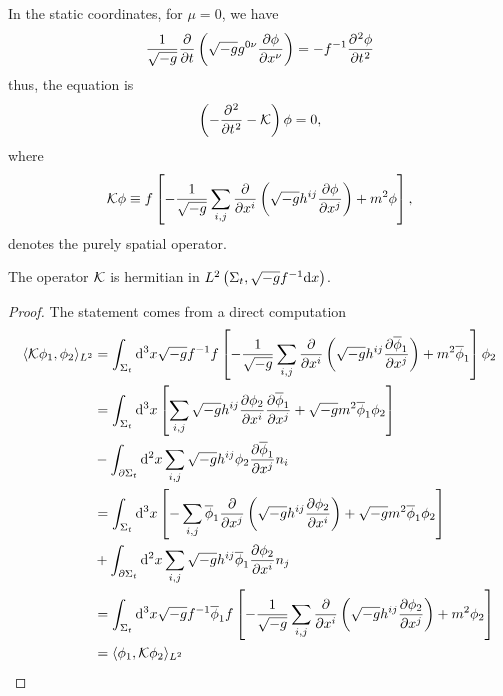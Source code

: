 In the static coordinates, for \(\mu=0\), we have
\begin{equation}
    \frac{1}{\sqrt{-g}}\diffp{}{t}\left(\sqrt{-g}g^{0\nu}\diffp{\phi}{x^\nu}\right)=-f^{-1}\diffp[2]{\phi}{t,}
\end{equation}
thus, the equation is
\begin{equation}
    \left(-\diffp[2]{}{t}-\mcK\right)\phi=0,
\end{equation}
where
\begin{equation}\label{eq:def-mcK}
    \mcK\phi\equiv f\left[-\frac{1}{\sqrt{-g}}\sum_{i,j}\diffp{}{x^i}\left(\sqrt{-g}h^{ij}\diffp{\phi}{x^j}\right)+m^2\phi\right],
\end{equation}
denotes the purely spatial operator.
\begin{proposition}
    The operator \({\mathcal{K}}\) is hermitian in \(L^2\left(\Sigma_t,\sqrt{-g}f^{-1}\mathrm{d} x\right)\).
\end{proposition}
\begin{proof}
    The statement comes from a direct computation
    \begin{subequations}
        \begin{align}
            \langle\mcK\phi_1,\phi_2\rangle_{L^2}&=\int_{\Sig_t}\rmd^3x\sqrt{-g}f^{-1}f\left[-\frac{1}{\sqrt{-g}}\sum_{i,j}\diffp{}{x^i}\left(\sqrt{-g}h^{ij}\diffp{\overline{\phi}_1}{x^j}\right)+m^2\overline{\phi}_1\right]\phi_2\\
            &=\int_{\Sig_t}\rmd^3x\left[\sum_{i,j}\sqrt{-g}h^{ij}\diffp{\phi_2}{x^i}\diffp{\overline{\phi}_1}{x^j}+\sqrt{-g}m^2\overline{\phi}_1\phi_2\right]\\
            &-\int_{\partial\Sig_t}\rmd^2x\sum_{i,j}\sqrt{-g}h^{ij}\phi_2\diffp{\overline{\phi}_1}{x^j}n_i\\
            &=\int_{\Sig_t}\rmd^3x\left[-\sum_{i,j}\overline{\phi}_1\diffp{}{x^j}\left(\sqrt{-g}h^{ij}\diffp{\phi_2}{x^i}\right)+\sqrt{-g}m^2\overline{\phi}_1\phi_2\right]\\
            &+\int_{\partial\Sig_t}\rmd^2x\sum_{i,j}\sqrt{-g}h^{ij}\overline{\phi}_1\diffp{\phi_2}{x^i}n_j\\
            &=\int_{\Sig_t}\rmd^3x\sqrt{-g}f^{-1}\overline{\phi}_1f\left[-\frac{1}{\sqrt{-g}}\sum_{i,j}\diffp{}{x^i}\left(\sqrt{-g}h^{ij}\diffp{\phi_2}{x^j}\right)+m^2\phi_2\right]\\
            &=\langle\phi_1,\mcK\phi_2\rangle_{L^2}
        \end{align}
    \end{subequations}
\end{proof}


